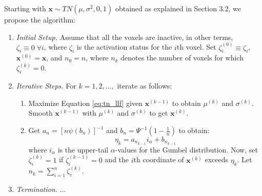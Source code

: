 Starting with $\bm{x} \sim TN(\mu,\sigma^2,0,1)$ obtained as explained in Section $3.2$, we propose the algorithm:

\begin{enumerate}
\item \textit{Initial Setup.} Assume that all the voxels are inactive, in other terms, $\zeta_i \equiv 0 \; \forall i$, where $\zeta_i$ is the activation status for the $i$th voxel. Set $\zeta_i^{(0)} \equiv \zeta_i $, $\bm{x}^{(0)} = \bm{x} $, and $n_0 = n$, where $n_k$ denotes the number of voxels for which $\zeta_i^{(k)} = 0$.
\item \textit{Iterative Steps.} For $k=1,2,\dots,$ iterate as follows:
\begin{enumerate}
\item Maximize Equation \ref{eq:tn_llf} given $\bm{x}^{(k-1)}$ to obtain $\mu^{(k)}$ and $\sigma^{(k)}$. Smooth $\bm{x}^{(k-1)}$ with $\mu^{(k)}$ and $\sigma^{(k)}$ to get $\bm{x}^{(k)}$.
\item Get $a_n=\left[n\psi(b_n)\right]^{-1}$ and $b_n=\Psi^{-1}(1-\frac{1}{n})$ to obtain: $$\eta_k = a_{n_{k-1}}i_{\alpha} + b_{n_{k-1}}$$
where $i_{\alpha}$ is the upper-tail $\alpha$-values for the Gumbel distribution. Now, set $\zeta_i^{(k)} = 1$ if $\zeta_i^{(k-1)} = 0$ and the $i$th coordinate of $\bm{x}^{(k)}$ exceeds $\eta_k$. Let $n_k=\sum_{i=1}^n \zeta_i^{(k)}$.
\end{enumerate}
\item \textit{Termination.} ...
\end{enumerate}